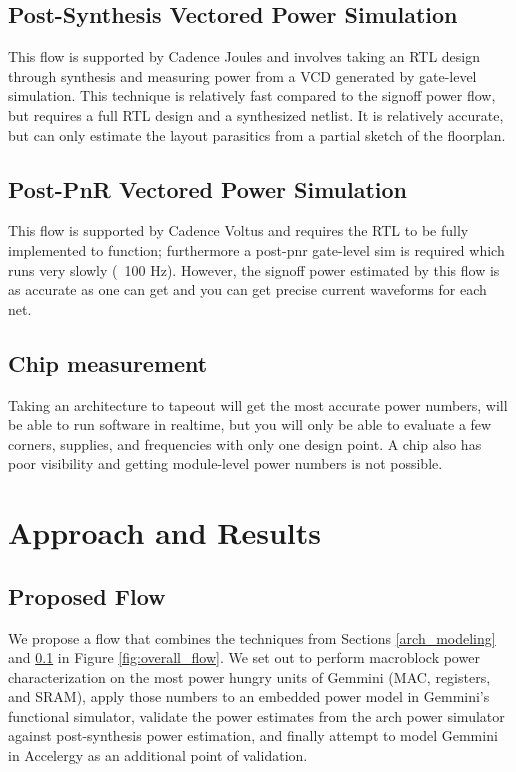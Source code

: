 \documentclass[sigconf]{acmart}
\begin{document}
\subsection{Post-Synthesis Vectored Power Simulation}\label{syn_modeling}
This flow is supported by Cadence Joules and involves taking an RTL design through synthesis and measuring power from a VCD generated by gate-level simulation.
This technique is relatively fast compared to the signoff power flow, but requires a full RTL design and a synthesized netlist.
It is relatively accurate, but can only estimate the layout parasitics from a partial sketch of the floorplan.

\subsection{Post-PnR Vectored Power Simulation}
This flow is supported by Cadence Voltus and requires the RTL to be fully implemented to function; furthermore a post-pnr gate-level sim is required which runs very slowly (~100 Hz).
However, the signoff power estimated by this flow is as accurate as one can get and you can get precise current waveforms for each net.

\subsection{Chip measurement}
Taking an architecture to tapeout will get the most accurate power numbers, will be able to run software in realtime, but you will only be able to evaluate a few corners, supplies, and frequencies with only one design point.
A chip also has poor visibility and getting module-level power numbers is not possible.

\section{Approach and Results}

\subsection{Proposed Flow}
We propose a flow that combines the techniques from Sections \ref{arch_modeling} and \ref{syn_modeling} in Figure \ref{fig:overall_flow}.
We set out to perform macroblock power characterization on the most power hungry units of Gemmini (MAC, registers, and SRAM), apply those numbers to an embedded power model in Gemmini's functional simulator, validate the power estimates from the arch power simulator against post-synthesis power estimation, and finally attempt to model Gemmini in Accelergy as an additional point of validation.
\end{document}
